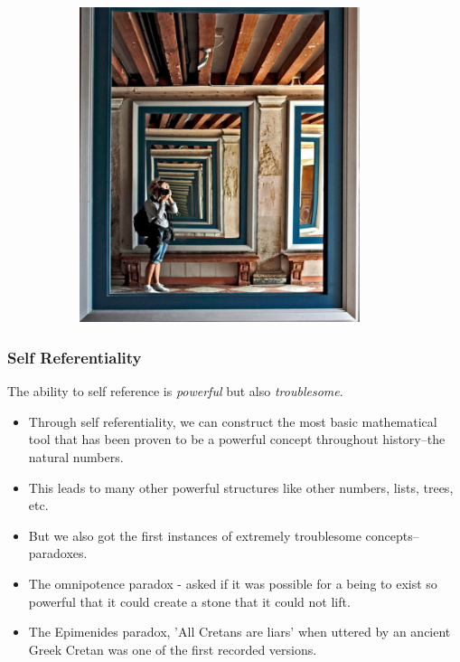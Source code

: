 \documentclass{beamer}
\begin{document}
\begin{frame}
\begin{figure}
\begin{subfigure}{0.3\textwidth}
    \end{subfigure}
    \begin{subfigure}{0.3\textwidth}
      \includegraphics[width=0.9\textwidth]{images/reflections.jpg}
    \end{subfigure}
  \end{figure}
\end{frame}

\begin{frame}
  \frametitle{Self Referentiality}
  The ability to self reference is \emph{powerful} but also \emph{troublesome}.
  \begin{itemize}
  \item<2-> Through self referentiality, we can construct the most basic mathematical tool that has
    been proven to be a powerful concept throughout history--the natural numbers.
  \item<3-> This leads to many other powerful structures like other numbers, lists, trees, etc.
  \item<4-> But we also got the first instances of extremely troublesome concepts--paradoxes.
  \item<5-> The omnipotence paradox - asked if it was possible for a being to exist so powerful that it could create a stone that it could not lift.
  \item<6-> The Epimenides paradox, 'All Cretans are liars' when uttered by an ancient Greek Cretan was one of the first recorded versions. 
  \end{itemize}
\end{frame}
\end{document}
